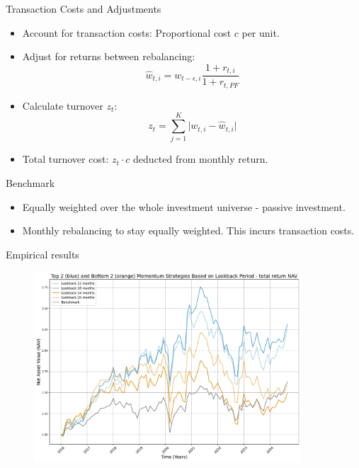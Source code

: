 \documentclass{beamer}
\begin{document}
\begin{frame}[t]{Transaction Costs and Adjustments}
    \begin{itemize}
        \item Account for transaction costs: Proportional cost $c$ per unit.
        \item Adjust for returns between rebalancing:
        \begin{equation}
            \hat{w}_{t,i} = w_{t-\epsilon,i} \frac{1 + r_{t,i}}{1 + r_{t,PF}}
        \end{equation}
        \item Calculate turnover $z_t$:
        \begin{equation}
            z_{t} = \sum_{j=1}^{K}\lvert w_{t,i} - \hat{w}_{t,i} \rvert
        \end{equation}
        \item Total turnover cost: $z_t \cdot c$ deducted from monthly return.
    \end{itemize}
\end{frame}

\begin{frame}[t]{Benchmark}
    \begin{itemize}
        \item Equally weighted over the whole investment universe - passive investment.
        \item Monthly rebalancing to stay equally weighted. This incurs transaction costs.
    \end{itemize}
\end{frame}


\begin{frame}[t]{Empirical results}
    \begin{figure}[t!]\centering
    \includegraphics[width=10cm]{figures/fig_bm.pdf}
    \centering
    \label{fig_bm}
    \end{figure}
\end{frame}
\end{document}
